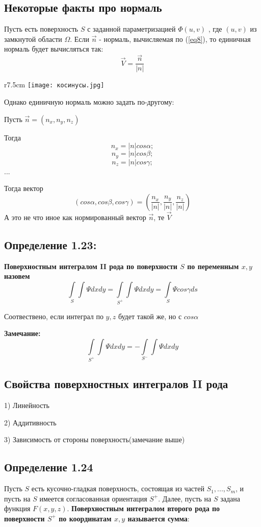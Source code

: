 \documentclass[12pt, english]{article}
\begin{document}
\subsection*{Некоторые факты про нормаль}

	Пусть есть поверхность $S$ с заданной параметризацией $\Phi(u,v)$ , где $(u,v)$ из замкнутой области $\Omega$. Если $\vec{n}$ - нормаль, вычисляемая по (\ref{eq8}), то единичная нормаль будет вычисляться так:
	$$\vec{V} = \frac{\vec{n}}{|n|}$$

\begin{wrapfigure}{r}{7.5cm}
\texttt{[image: косинусы.jpg]}
\end{wrapfigure}	
	
Однако единичную нормаль можно задать по-другому:

Пусть $\vec{n} = (n_x , n_y , n_z)$

Тогда 
$$
n_x = |n|cos\alpha;
$$
$$
n_y = |n|cos\beta;
$$
$$
n_z = |n|cos\gamma;
$$
...

Тогда вектор 
$$
(cos\alpha , cos\beta , cos\gamma) = (\frac{n_x}{|n|} , \frac{n_y}{|n|} , \frac{n_z}{|n|})
$$
А это не что иное как нормированный вектор $\vec{n}$, те $\vec{V}$

\subsection*{Определение 1.23:}\label{eq9}
\textbf{	Поверхностным интегралом II рода по поверхности $S$ по переменным $x,y$ назовем}
$$
\int\limits_{S}\int \Psi dxdy 
=
\int\limits_{S^+}\int \Psi dxdy 
=
\int\limits_{S} \Psi cos\gamma ds 
$$
	
Соотвествено, если интеграл по $y , z$ будет такой же, но с $cos\alpha$

\textbf{Замечание:}
$$
\int\limits_{S^+}\int \Psi dxdy 
=
-\int\limits_{S^-}\int \Psi dxdy
$$

\subsection{Свойства поверхностных интегралов II рода}
	1) Линейность
	
	2) Аддитивность
	
	3) Зависимость от стороны поверхность(замечание выше)

\subsection*{Определение 1.24}
	Пусть $S$ есть кусочно-гладкая поверхность, состоящая из частей $S_1,...,
S_m$, и пусть на $S$ имеется согласованная ориентация $S^+$. Далее, пусть на $S$
задана функция $F(x, y, z)$. \textbf{Поверхностным интегралом второго рода по поверхности $S^+$ по координатам $x, y$ называется сумма}:
\end{document}
